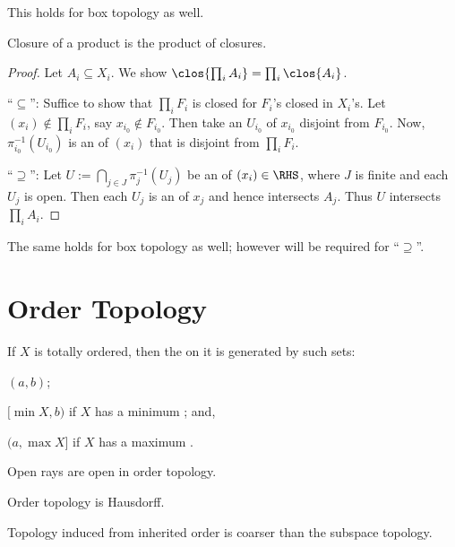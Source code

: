 	\begin{rmk}
		This holds for box topology as well.
	\end{rmk}
	
	\begin{lem}
		Closure of a product is the product of closures.
	\end{lem}
	
	\begin{proof}
		Let $A_i\subseteq X_i$. We show $\clos{\prod_i A_i} = \prod_i\clos{A_i}$.
		
		``$\subseteq$'': Suffice to show that $\prod_i F_i$ is closed for $F_i$'s closed in $X_i$'s. Let $(x_i)\notin\prod_i F_i$, say $x_{i_0}\notin F_{i_0}$. Then take an \onbd $U_{i_0}$ of $x_{i_0}$ disjoint from $F_{i_0}$. Now, $\pi_{i_0}^{-1}(U_{i_0})$ is an \onbd of $(x_i)$ that is disjoint from $\prod_i F_i$.
		
		``$\supseteq$'': Let $U := \bigcap_{j\in J}\pi_j^{-1}(U_j)$ be an \onbd of $(x_i)\in\RHS$, where $J$ is finite and each $U_j$ is open. Then each $U_j$ is an \onbd of $x_j$ and hence intersects $A_j$. Thus $U$ intersects $\prod_i A_i$.
	\end{proof}
	
	\begin{rmk}
		The same holds for box topology as well; however \AC will be required for ``$\supseteq$''.
	\end{rmk}
	
	


\section{Order Topology}
If $X$ is totally ordered, then the  on it is generated by such sets:
\begin{rmklist}
	\item $(a, b)$;
	\item $[\min X, b)$ if $X$ has a minimum \elt; and,
	\item $(a, \max X]$ if $X$ has a maximum \elt.
\end{rmklist}

	\begin{lem}\label{LEM: triv things on order topo}
		\leavevmode
		\begin{mylist}
			\item Open rays are open in order topology.
			\item Order topology is Hausdorff.
			\item\label{LEMiii: triv things on order topo} Topology induced from inherited order is coarser than the subspace topology.
		\end{mylist}
	\end{lem}
	

